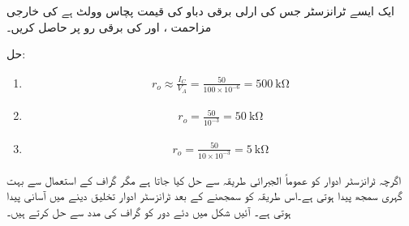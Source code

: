 ایک ایسے   ٹرانزسٹر جس کی ارلی برقی دباو کی قیمت پچاس وولٹ   ہے کی خارجی مزاحمت  ، اور   کی برقی رو پر حاصل کریں۔

حل:
\begin{enumerate}
\item
\begin{align*}
r_o \approx \frac{I_C}{V_A}=\frac{50}{100 \times 10^{-6}}=\SI{500}{\kilo \ohm}
\end{align*}

\item
\begin{align*}
r_o = \frac{50}{10^{-3}}=\SI{50}{\kilo \ohm}
\end{align*}

\item
\begin{align*}
r_o = \frac{50}{10 \times 10^{-3}}=\SI{5}{\kilo \ohm}
\end{align*}

\end{enumerate}

اگرچہ ٹرانزسٹر ادوار کو عموماً الجبرائی طریقہ سے حل کیا جاتا ہے مگر گراف کے استعمال سے بہت گہری سمجھ پیدا ہوتی ہے۔اس طریقہ کو سمجھنے کے بعد ٹرانزسٹر ادوار تخلیق دینے میں آسانی پیدا ہوتی ہے۔ آئیں شکل   میں دئے دور کو گراف کی مدد سے حل کرتے ہیں۔

